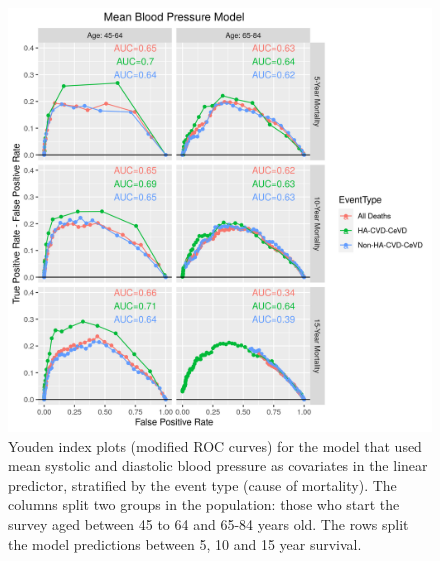\documentclass[
]{article}
\begin{document}
\begin{figure}
\centering
\includegraphics{./Rmarkdown_Plots/ROC_MeanBPModel_CAx-EventType.png}
\caption{Youden index plots (modified ROC curves) for the model that used mean systolic and diastolic blood pressure as covariates in the linear predictor, stratified by the event type (cause of mortality). The columns split two groups in the population: those who start the survey aged between 45 to 64 and 65-84 years old. The rows split the model predictions between 5, 10 and 15 year survival.}\label{fig:ROC_MeanBP}
\end{figure}
\end{document}

